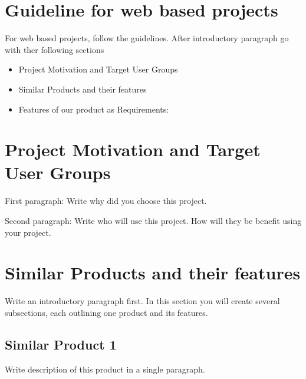 \section{Guideline for web based projects}
For web based projects, follow the guidelines.
After introductory paragraph go with ther following sections
\begin{itemize}
    \item Project Motivation and Target User Groups
    \item Similar Products and their features
    \item Features of our product as Requirements:
\end{itemize}

\section{Project Motivation and Target User Groups}
First paragraph: Write why did you choose this project.

Second paragraph: Write who will use this project. How will they be benefit using your project.

\section{Similar Products and their features}
Write an introductory paragraph first. In this section you will create several subsections, each outlining one product and its features.
\subsection{Similar Product 1}
Write description of this product in a single paragraph. 

